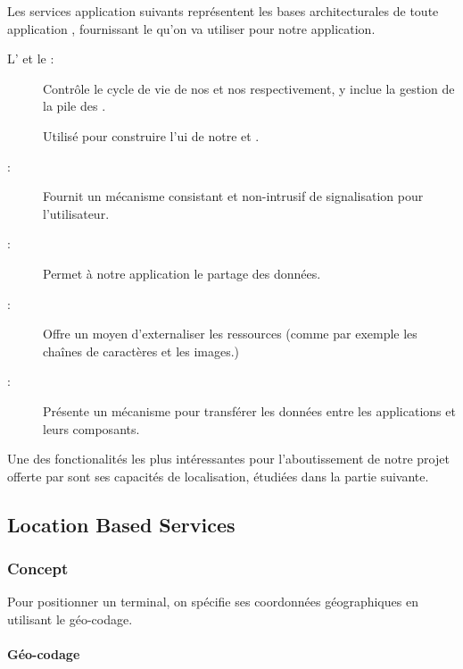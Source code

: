 Les services application suivants représentent les bases architecturales de toute application \android{}, fournissant le  qu'on va utiliser pour notre application.

\begin{description}

\item [L' et le :]
Contrôle le cycle de vie de nos  et nos  respectivement, y inclue la gestion de la pile des .

\item[]
Utilisé pour construire l'\gls{ui} de notre  et .

\item[:]
Fournit un mécanisme consistant et non-intrusif de signalisation pour l'utilisateur.

\item[:]
Permet à notre application le partage des données.

\item[:]
Offre un moyen d'externaliser les ressources (comme par exemple les chaînes de caractères et les images.)

\item[:]
Présente un mécanisme pour transférer les données entre les applications et leurs composants.

\end{description}

Une des fonctionalités les plus intéressantes pour l'aboutissement de notre projet offerte par \android{} sont ses capacités de localisation, étudiées dans la partie suivante.

\subsection{Location Based Services}

\subsubsection{Concept}

Pour positionner un terminal, on spécifie ses coordonnées géographiques
en utilisant le géo-codage.

\paragraph[Géo-codage]{Géo-codage\cite{wiki:geocoding}}

